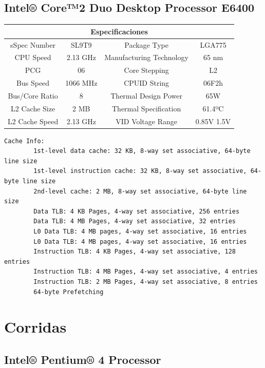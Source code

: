\documentclass[a4paper,10pt]{article}
\begin{document}
\subsection{Intel® Core™2 Duo Desktop Processor E6400}

\begin{tabular}{|c|c||c|c|}
\hline
\multicolumn{4}{|c|}{Especificaciones} \\
\hline
sSpec Number  & SL9T9  & Package Type & LGA775 \\
\hline
CPU Speed  & 2.13 GHz  & Manufacturing Technology & 65 nm \\
\hline
PCG  & 06  & Core Stepping & L2 \\
\hline
Bus Speed  & 1066 MHz  & CPUID String & 06F2h \\
\hline
Bus/Core Ratio  & 8  & Thermal Design Power & 65W \\
\hline
L2 Cache Size  & 2 MB & Thermal Specification & 61.4ºC \\
\hline
L2 Cache Speed  & 2.13 GHz & VID Voltage Range & 0.85V  1.5V \\
\hline
\end{tabular}

\begin{verbatim}
Cache Info:
        1st-level data cache: 32 KB, 8-way set associative, 64-byte line size
        1st-level instruction cache: 32 KB, 8-way set associative, 64-byte line size
        2nd-level cache: 2 MB, 8-way set associative, 64-byte line size
        Data TLB: 4 KB Pages, 4-way set associative, 256 entries
        Data TLB: 4 MB Pages, 4-way set associative, 32 entries
        L0 Data TLB: 4 MB pages, 4-way set associative, 16 entries
        L0 Data TLB: 4 MB pages, 4-way set associative, 16 entries
        Instruction TLB: 4 KB Pages, 4-way set associative, 128 entries
        Instruction TLB: 4 MB Pages, 4-way set associative, 4 entries
        Instruction TLB: 2 MB Pages, 4-way set associative, 8 entries
        64-byte Prefetching
\end{verbatim}

\clearpage
\section{Corridas}

\subsection{Intel® Pentium® 4 Processor}


\clearpage

\clearpage

\clearpage

\clearpage

\clearpage
\end{document}
